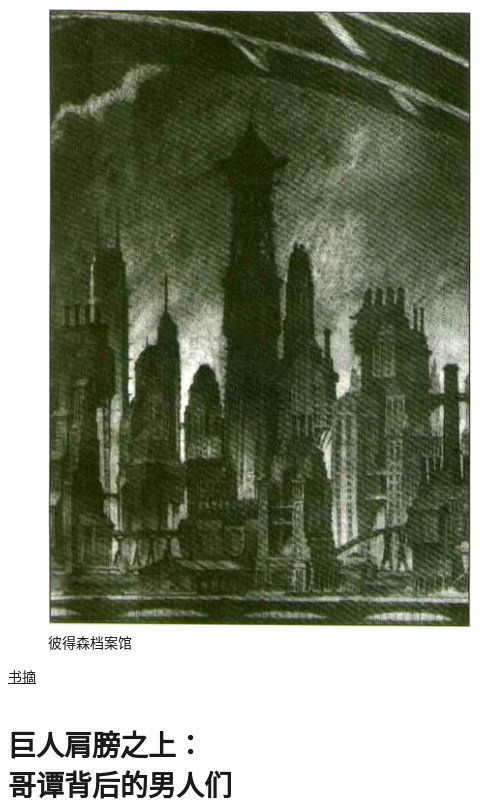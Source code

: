 \documentclass[9pt,openany]{extbook}
\begin{document}
\color{maincolor}
\pagestyle{mystyle}
\begin{multicols}{2}
    \setcounter{page}{52}
    \begin{figure}[H]
        \centering
        \includegraphics[width=\linewidth]{wayne family history.png}
        \caption{\hfill\color{maincolor} 彼得森档案馆}
    \end{figure}

    \fangsong\noindent\LARGE\underline{书\quad 摘}\rmfamily\normalsize
    \vspace{-2pt}

    \section{巨人肩膀之上：\\哥谭背后的男人们}


\end{multicols}
\end{document}
